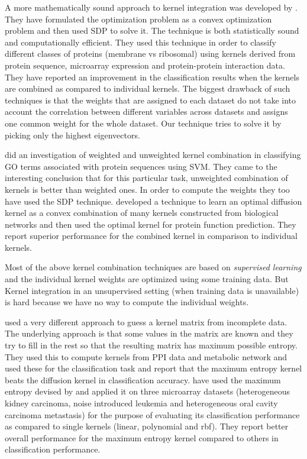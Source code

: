 A more mathematically sound approach to kernel integration was developed by \citet{lanck04kerneldatafusion}. They have formulated the optimization 
problem as a convex optimization problem and then used \ac{SDP} to solve it. The technique is both statistically sound and computationally efficient. 
They used this technique in order to classify different classes of proteins (membrane vs ribosomal) using kernels derived from protein 
sequence, microarray expression and protein-protein interaction data. They have reported an improvement in the classification results when 
the kernels are combined as compared to individual kernels. The biggest drawback of such techniques is that the weights that are assigned to each 
dataset do not take into account the correlation between different variables across datasets and assigns one common weight for the 
whole dataset. Our technique tries to solve it by picking only the highest eigenvectors.

\citet{lewis06svm} did an investigation of weighted and unweighted kernel combination in classifying GO terms associated with protein 
sequences using SVM. They came to the interesting conclusion that for this particular task, unweighted combination of kernels 
is better than weighted ones. In order to compute the weights they too have used the SDP technique. \citet{Liang2008Adaptive} 
developed a technique to learn an optimal diffusion kernel as a convex combination of many kernels constructed from biological networks 
and then used the optimal kernel for protein function prediction. They report superior performance for the combined kernel 
in comparison to individual kernels. 

Most of the above kernel combination techniques are based on \textit{supervised learning} and the individual kernel weights are 
optimized using some training data. But Kernel integration in an unsupervised setting (when training data is unavailable) is hard 
because we have no way to compute the individual weights. 

\citet{Tsuda2004Learning} used a very different approach to guess a kernel matrix from incomplete data. The underlying approach is that some 
values in the matrix are known and they try to fill in the rest so that the resulting matrix has maximum possible entropy. 
They used this to compute kernels from PPI data and metabolic network and used these for the classification task and report that 
the maximum entropy kernel beats the diffusion kernel in classification accuracy. \citet{fujibuchi2007classification} have used the maximum 
entropy devised by \citet{Tsuda2004Learning} and applied it on three microarray datasets (heterogeneous kidney carcinoma, noise introduced 
leukemia and heterogeneous oral cavity carcinoma metastasis) for the purpose of evaluating its classification performance as compared to 
single kernels (linear, polynomial and rbf). They report better overall performance for the maximum entropy kernel compared 
to others in classification performance.  

